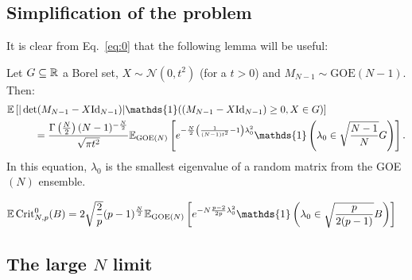 \documentclass[amsmath,amssymb,nofootinbib,prd]{article}
\begin{document}
	\subsection{Simplification of the problem}
	
	It is clear from Eq.~\ref{eq:0} that the following lemma will be useful:
	\begin{lemma}\label{lemma:simplification} Let $G \subseteq \mathbb{R}$ a Borel set, $X \sim \mathcal{N}(0,t^2)$ (for a $t > 0$) and $M_{N-1} \sim \mathrm{GOE}(N-1)$. Then:
	\begin{align}
	\EE &\left[|\det (M_{N-1} - X \mathrm{Id}_{N-1})| \mathds{1}( (M_{N-1} - X \mathrm{Id}_{N-1}) \geq 0, X \in G)\right] \nonumber \\
	&\qquad = \frac{\Gamma\left(\frac{N}{2}\right)(N-1)^{-\frac{N}{2}}}{\sqrt{\pi t^2}} \EE_{\mathrm{GOE}(N)} \left[e^{-\frac{N}{2}\left(\frac{1}{(N-1)t^2} - 1\right) \lambda_0^2} \mathds{1} \left(\lambda_0 \in \sqrt{\frac{N-1}{N}} G\right)\right].
	\end{align}
	In this equation, $\lambda_0$ is the smallest eigenvalue of a random matrix from the GOE$(N)$ ensemble. 
	\end{lemma}

	\begin{align}\label{eq:1}
	\EE \, \mathrm{Crit}_{N,p}^0(B) &= 2 \sqrt{\frac{2}{p}} (p-1)^{\frac{N}{2}} \EE_{\mathrm{GOE}(N)} \left[e^{-N \frac{p-2}{2p} \lambda_0^2} \mathds{1} \left(\lambda_0 \in  \sqrt{\frac{p}{2(p-1)}} B\right)\right]
\end{align}		
	
	
	\subsection{The large $N$ limit}
	
\end{document}
